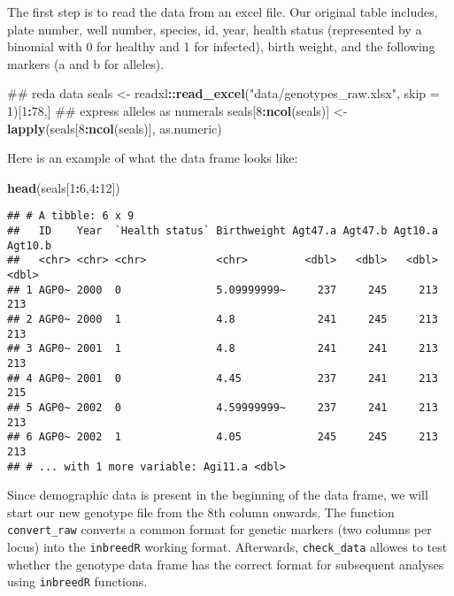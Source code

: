 \documentclass[]{article}
\newenvironment{Shaded}{\begin{snugshade}}{\end{snugshade}}
\newcommand{\KeywordTok}[1]{\textcolor[rgb]{0.13,0.29,0.53}{\textbf{#1}}}
\newcommand{\DataTypeTok}[1]{\textcolor[rgb]{0.13,0.29,0.53}{#1}}
\newcommand{\DecValTok}[1]{\textcolor[rgb]{0.00,0.00,0.81}{#1}}
\newcommand{\StringTok}[1]{\textcolor[rgb]{0.31,0.60,0.02}{#1}}
\newcommand{\OperatorTok}[1]{\textcolor[rgb]{0.81,0.36,0.00}{\textbf{#1}}}
\newcommand{\NormalTok}[1]{#1}
\begin{document}
The first step is to read the data from an excel file. Our original
table includes, plate number, well number, species, id, year, health
status (represented by a binomial with 0 for healthy and 1 for
infected), birth weight, and the following markers (a and b for
alleles).

\begin{Shaded}
\begin{Highlighting}[]
\NormalTok{## reda data}
\NormalTok{seals <-}\StringTok{ }\NormalTok{readxl}\OperatorTok{::}\KeywordTok{read_excel}\NormalTok{(}\StringTok{"data/genotypes_raw.xlsx"}\NormalTok{, }\DataTypeTok{skip =} \DecValTok{1}\NormalTok{)[}\DecValTok{1}\OperatorTok{:}\DecValTok{78}\NormalTok{,]}
\NormalTok{## express alleles as numerals}
\NormalTok{seals[}\DecValTok{8}\OperatorTok{:}\KeywordTok{ncol}\NormalTok{(seals)] <-}\StringTok{ }\KeywordTok{lapply}\NormalTok{(seals[}\DecValTok{8}\OperatorTok{:}\KeywordTok{ncol}\NormalTok{(seals)], as.numeric)}
\end{Highlighting}
\end{Shaded}

Here is an example of what the data frame looks like:

\begin{Shaded}
\begin{Highlighting}[]
\KeywordTok{head}\NormalTok{(seals[}\DecValTok{1}\OperatorTok{:}\DecValTok{6}\NormalTok{,}\DecValTok{4}\OperatorTok{:}\DecValTok{12}\NormalTok{])}
\end{Highlighting}
\end{Shaded}

\begin{verbatim}
## # A tibble: 6 x 9
##   ID    Year  `Health status` Birthweight Agt47.a Agt47.b Agt10.a Agt10.b
##   <chr> <chr> <chr>           <chr>         <dbl>   <dbl>   <dbl>   <dbl>
## 1 AGP0~ 2000  0               5.09999999~     237     245     213     213
## 2 AGP0~ 2000  1               4.8             241     245     213     213
## 3 AGP0~ 2001  1               4.8             241     241     213     213
## 4 AGP0~ 2001  0               4.45            237     241     213     215
## 5 AGP0~ 2002  0               4.59999999~     237     241     213     213
## 6 AGP0~ 2002  1               4.05            245     245     213     213
## # ... with 1 more variable: Agi11.a <dbl>
\end{verbatim}

Since demographic data is present in the beginning of the data frame, we
will start our new genotype file from the 8th column onwards. The
function \texttt{convert\_raw} converts a common format for genetic
markers (two columns per locus) into the \texttt{inbreedR} working
format. Afterwards, \texttt{check\_data} allowes to test whether the
genotype data frame has the correct format for subsequent analyses using
\texttt{inbreedR} functions.
\end{document}

